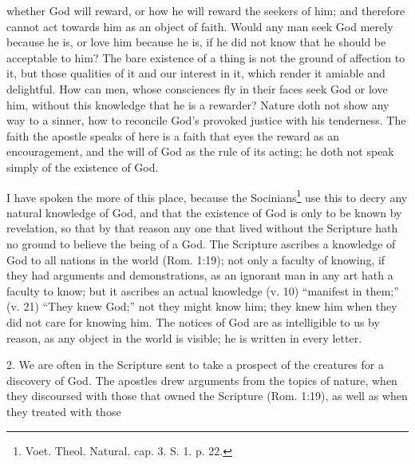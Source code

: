 \documentclass[a5paper]{book}
\begin{document}
    whether God will reward, 
    or how he will reward the seekers of him; 
    and therefore cannot act towards him as an object of faith. 
Would any man seek God merely because he is, 
    or love him because he is, 
    if he did not know that he should be acceptable to him?
The bare existence of a thing is not the ground of affection to it, 
    but those qualities of it and our interest in it, 
    which render it amiable and delightful. 
How can men, 
    whose consciences fly in their faces seek God or love him, 
    without this knowledge that he is a rewarder? 
Nature doth not show any way to a sinner, 
    how to reconcile God’s provoked justice with his tenderness. 
The faith the apostle speaks of here is 
    a faith that eyes the reward as an encouragement, 
    and the will of God as the rule of its acting; 
    he doth not speak simply of the existence of God.

I have spoken the more of this place, 
    because the Socinians\footnote{Voet. Theol. Natural. cap. 3. S. 1. p. 22.} 
    use this to decry any natural knowledge of God, 
    and that the existence of God is only to be known by revelation, 
    so that by that reason any one that lived without the Scripture 
    hath no ground to believe the being of a God. 
The Scripture ascribes a knowledge of God 
    to all nations in the world (Rom. 1:19); 
    not only a faculty of knowing, 
    if they had arguments and demonstrations, 
    as an ignorant man in any art hath a faculty to know; 
    but it ascribes an actual knowledge (v. 10) ``manifest in them;'' 
    (v. 21) ``They knew God;'' not they might know him; 
    they knew him when they did not care for knowing him. 
The notices of God are as intelligible to us by reason, 
    as any object in the world is visible; 
    he is written in every letter.

2. We are often in the Scripture sent 
    to take a prospect of the creatures for a discovery of God. 
The apostles drew arguments from the topics of nature, 
    when they discoursed with those that owned the Scripture (Rom. 1:19), 
    as well as when they treated with those
\end{document}

